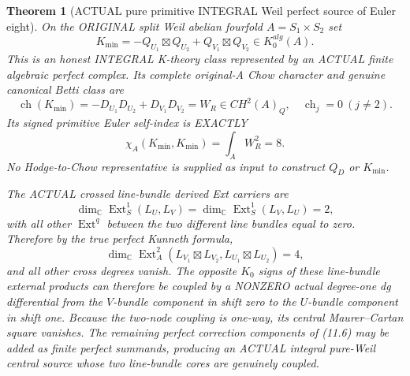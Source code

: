 \documentclass[11pt,a4paper]{article}
\newcommand{\ch}{\operatorname{ch}}
\newtheorem{theorem}{Theorem}[section]
\begin{document}
\begin{theorem}[ACTUAL pure primitive INTEGRAL Weil perfect source of Euler eight]
On the ORIGINAL
split Weil
abelian fourfold
\(A=S_1\times S_2\)
set
\[
 \boxed{
 K_{\min}
   =-Q_{U_1}\boxtimes Q_{U_2}
        +Q_{V_1}\boxtimes Q_{V_2}
                    \in K_0^{alg}(A).}
                                                               \tag{11.6}
\]
This is an
honest INTEGRAL
K-theory
class represented
by an ACTUAL
finite algebraic
perfect complex.
Its complete
original-A
Chow character
and genuine
canonical Betti
class are
\[
 \boxed{
 \ch(K_{\min})
     =-D_{U_1}D_{U_2}
        +D_{V_1}D_{V_2}
     =W_R\in CH^2(A)_Q,
 \quad
 \ch_j=0\ (j\ne2).
 }                                                       \tag{11.7}
\]
Its signed
primitive
Euler self-index
is EXACTLY
\[
 \boxed{
        \chi_A(K_{\min},K_{\min})
            =\int_A W_R^2=8 .
 }                                                       \tag{11.8}
\]
No Hodge-to-Chow
representative
is supplied as
input to
construct \(Q_D\)
or \(K_{\min}\).

The ACTUAL
crossed line-bundle
derived Ext
carriers are
\[
 \boxed{
 \dim_{\mathbb C}
 \operatorname{Ext}^1_S(L_U,L_V)
 =\dim_{\mathbb C}
 \operatorname{Ext}^1_S(L_V,L_U)=2,
 }                                                       \tag{11.9}
\]
with all
other \(\operatorname{Ext}^q\)
between the two
different
line bundles
equal to zero.
Therefore by
the true perfect
Kunneth formula,
\[
 \boxed{
 \dim_{\mathbb C}
 \operatorname{Ext}^2_A
   (L_{V_1}\boxtimes L_{V_2},
    L_{U_1}\boxtimes L_{U_2})
       =4,
 }                                                       \tag{11.10}
\]
and all other
cross degrees
vanish.
The opposite
\(K_0\) signs
of these
line-bundle
external products
can therefore
be coupled by
a NONZERO
actual degree-one
dg differential
from the
\(V\)-bundle
component
in shift zero
to the
\(U\)-bundle
component
in shift one.
Because the
two-node
coupling is
one-way, its
central
Maurer--Cartan
square vanishes.
The remaining
perfect correction
components of
(11.6) may be
added as finite
perfect summands,
producing an
ACTUAL integral
pure-Weil
central source
whose two
line-bundle
cores are
genuinely coupled.
\end{theorem}
\end{document}
